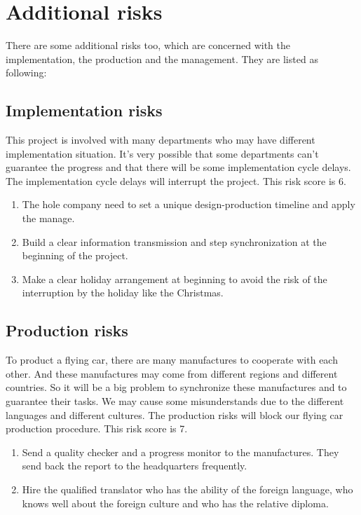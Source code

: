 \section{Additional risks}

There are some additional risks too, which are concerned with the implementation, the production and the management. They are listed as following:

\subsection{Implementation risks}

This project is involved with many departments who may have different implementation situation. It’s very possible that some departments can’t guarantee the progress and that there will be some implementation cycle delays. The implementation cycle delays will interrupt the project. This risk score is 6.

\begin{enumerate}
\item The hole company need to set a unique design-production timeline and apply the manage.

\item Build a clear information transmission and step synchronization at the beginning of the project.

\item Make a clear holiday arrangement at beginning to avoid the risk of the interruption by the holiday like the Christmas.
\end{enumerate}

\subsection{Production risks}

To product a flying car, there are many manufactures to cooperate with each other. And these manufactures may come from different regions and different countries. So it will be a big problem to synchronize these manufactures and to guarantee their tasks. We may cause some misunderstands due to the different languages and different cultures. The production risks will block our flying car production procedure. This risk score is 7.

\begin{enumerate}
\item Send a quality checker and a progress monitor to the manufactures. They send back the report to the headquarters frequently.

\item Hire the qualified translator who has the ability of the foreign language, who knows well about the foreign culture and who has the relative diploma.
\end{enumerate}

